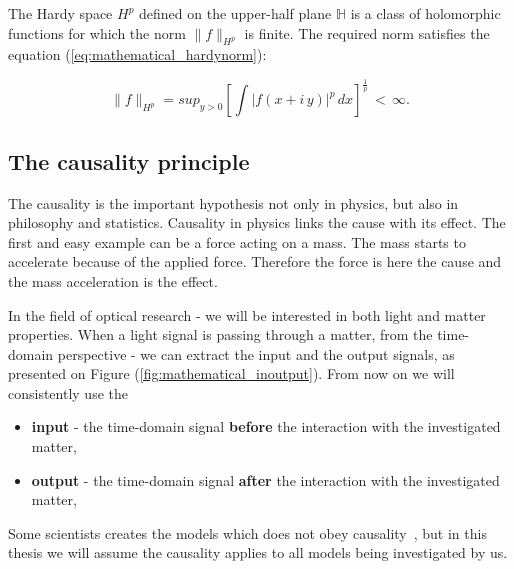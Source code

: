 \documentclass[12pt,twoside,a4paper]{article}
\numberwithin{equation}{subsection}
\numberwithin{figure}{subsection}
\begin{document}
The Hardy space $ H^{p} $ defined on the upper-half plane $ \mathbb{H} $ is a class of holomorphic functions for which the norm $ \|f\|_{H^p} $ is finite. The required norm satisfies the equation (\ref{eq:mathematical_hardynorm}):

\begin{equation} \label{eq:mathematical_hardynorm}
  \|f\|_{H^p} = sup_{ y > 0 } \left[ \int |f(x + i \, y)|^{p} \, dx \right]^{\frac{1}{p}} \, < \, \infty.
\end{equation}

\subsection{The causality principle} \label{chap:mathematical_causality}

The causality is the important hypothesis not only in physics, but also in philosophy and statistics. Causality in physics links the cause with its effect. The first and easy example can be a force acting on a mass. The mass starts to accelerate because of the applied force. Therefore the force is here the cause and the mass acceleration is the effect.

In the field of optical research - we will be interested in both light and matter properties. When a light signal is passing through a matter, from the time-domain perspective - we can extract the input and the output signals, as presented on Figure (\ref{fig:mathematical_inoutput}). From now on we will consistently use the 

\begin{itemize}
  \item \textbf{input} - the time-domain signal \textbf{before} the interaction with the investigated matter,
  \item \textbf{output} - the time-domain signal \textbf{after} the interaction with the investigated matter,
\end{itemize}

Some scientists creates the models which does not obey causality~\cite{mukamel_causal}, but in this thesis we will assume the causality applies to all models being investigated by us.
\end{document}
